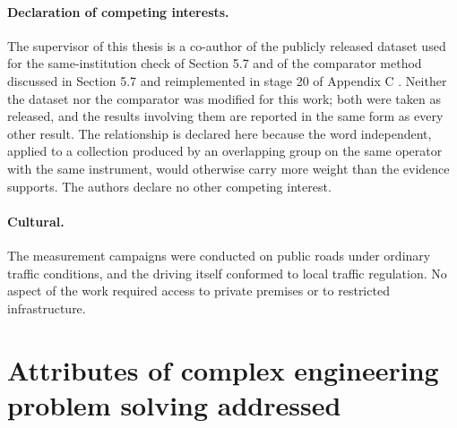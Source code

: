 \paragraph{Declaration of competing interests.} The supervisor of this thesis is a co-author of the publicly released dataset used for the same-institution check of Section 5.7 \cite{ref38} and of the comparator method discussed in Section 5.7 and reimplemented in stage 20 of Appendix C \cite{ref39}. Neither the dataset nor the comparator was modified for this work; both were taken as released, and the results involving them are reported in the same form as every other result. The relationship is declared here because the word independent, applied to a collection produced by an overlapping group on the same operator with the same instrument, would otherwise carry more weight than the evidence supports. The authors declare no other competing interest.

\paragraph{Cultural.} The measurement campaigns were conducted on public roads under ordinary traffic conditions, and the driving itself conformed to local traffic regulation. No aspect of the work required access to private premises or to restricted infrastructure.

\clearpage
\section{Attributes of complex engineering problem solving addressed}
\label{sec:6_7}


